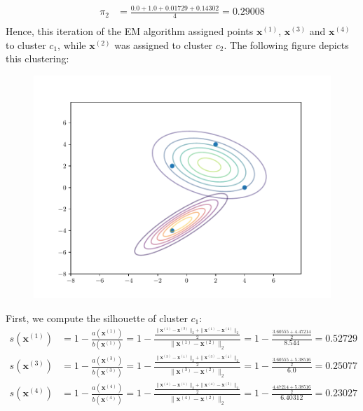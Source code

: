\documentclass{exam}
\begin{document}
\begin{questions}
\begin{itemize}
\begin{align*}
                \pi_2 &= \frac{0.0 + 1.0 + 0.01729 + 0.14302}{4} = 0.29008 \\
            \end{align*}
            Hence, this iteration of the EM algorithm assigned points $\textbf{x}^{(1)}$, $\textbf{x}^{(3)}$ and $\textbf{x}^{(4)}$ to cluster $c_1$, while $\textbf{x}^{(2)}$ was assigned to cluster $c_2$. The following figure depicts this clustering:
            \begin{figure}[H]
                \centering
                \includegraphics[scale = 0.75]{EM_clusters.pdf}
            \end{figure}
        \end{itemize}
        \item First, we compute the silhouette of cluster $c_1$:
            \begin{align*}
                s(\textbf{x}^{(1)}) &= 1 - \frac{a(\textbf{x}^{(1)})}{b(\textbf{x}^{(1)})} = 1 - \frac{\frac{\|\textbf{x}^{(1)} - \textbf{x}^{(3)}\|_2 + \|\textbf{x}^{(1)} - \textbf{x}^{(4)}\|_2}{2}}{\|\textbf{x}^{(1)} - \textbf{x}^{(2)}\|_2} = 1 - \frac{\frac{ 3.60555 + 4.47214}{2}}{8.544} = 0.52729 \\
                s(\textbf{x}^{(3)}) &= 1 - \frac{a(\textbf{x}^{(3)})}{b(\textbf{x}^{(3)})} = 1 - \frac{\frac{\|\textbf{x}^{(3)} - \textbf{x}^{(1)}\|_2 + \|\textbf{x}^{(3)} - \textbf{x}^{(4)}\|_2}{2}}{\|\textbf{x}^{(3)} - \textbf{x}^{(2)}\|_2} = 1 - \frac{\frac{ 3.60555 + 5.38516}{2}}{6.0} = 0.25077 \\
                s(\textbf{x}^{(4)}) &= 1 - \frac{a(\textbf{x}^{(4)})}{b(\textbf{x}^{(4)})} = 1 - \frac{\frac{\|\textbf{x}^{(4)} - \textbf{x}^{(1)}\|_2 + \|\textbf{x}^{(4)} - \textbf{x}^{(3)}\|_2}{2}}{\|\textbf{x}^{(4)} - \textbf{x}^{(2)}\|_2} = 1 - \frac{\frac{4.47214 + 5.38516}{2}}{6.40312} = 0.23027 \\

\end{align*}
\end{questions}
\end{document}

